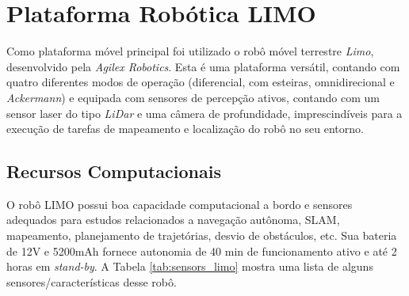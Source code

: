 \section{Plataforma Robótica LIMO}
\label{sec:Plataforma_LIMO}

    Como plataforma móvel principal foi utilizado o robô móvel terrestre \textit{Limo}, desenvolvido pela \textit{Agilex Robotics}. Esta é uma plataforma versátil, contando com quatro diferentes modos de operação (diferencial, com esteiras, omnidirecional e \textit{Ackermann}) e equipada com sensores de percepção ativos, contando com um sensor laser do tipo \textit{LiDar} e uma câmera de profundidade, imprescindíveis para a execução de tarefas de mapeamento e localização do robô no seu entorno.

    \subsection{Recursos Computacionais}
    \label{sec:Recursos_LIMO}
        O robô LIMO possui boa capacidade computacional a bordo e sensores adequados para estudos relacionados a navegação autônoma, SLAM, mapeamento, planejamento de trajetórias, desvio de obstáculos, etc. Sua bateria de 12V e 5200mAh fornece autonomia de 40 min de funcionamento ativo e até 2 horas em \textit{stand-by}. A Tabela \ref{tab:sensors_limo} mostra uma lista de alguns sensores/características desse robô.

